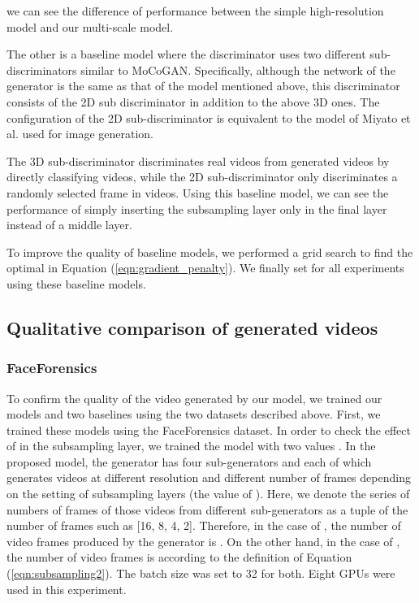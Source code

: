 \documentclass[twocolumn]{svjour3}
\def\Eq#1{Equation (\ref{eqn:#1})}
\begin{document}
we can see the difference of performance between the simple high-resolution model and our multi-scale model.


The other is a baseline model where the discriminator uses two different sub-discriminators similar to MoCoGAN.
Specifically, although the network of the generator is the same as that of the model mentioned above,
this discriminator consists of the 2D sub\discretionary{-}{-}{-} discriminator in addition to the above 3D ones.
The configuration of the 2D sub-discriminator is equivalent to the model of Miyato et al. \cite{Miyato2018} used for image generation.


The 3D sub-discriminator discriminates real videos from generated videos by directly classifying videos,
while the 2D sub-discriminator only discriminates a randomly selected frame in videos.
Using this baseline model, we can see the performance of simply inserting
the subsampling layer only in the final layer instead of a middle layer.




To improve the quality of baseline models,
we performed a grid search to find the optimal  in \Eq{gradient_penalty}.
We finally set  for all experiments using these baseline models.

\subsection{Qualitative comparison of generated videos}
\subsubsection{FaceForensics}
\label{sec:face_forensics}

To confirm the quality of the video generated by our model,
we trained our models and two baselines using the two datasets described above.
First, we trained these models using the FaceForensics \cite{Rossler2018} dataset.
In order to check the effect of  in the subsampling layer,
we trained the model with two values .
In the proposed model, the generator has four sub-generators and each of which generates videos at different resolution and different number of frames depending on the setting of subsampling layers (the value of ).
Here, we denote the series of numbers of frames of those videos from different sub-generators as a tuple of the number of frames such as [16, 8, 4, 2].
Therefore, in the case of , the number of video frames produced by the generator is .
On the other hand, in the case of , the number of video frames is  according to the definition of \Eq{subsampling2}.
The batch size was set to 32 for both. Eight GPUs were used in this experiment.
\end{document}

